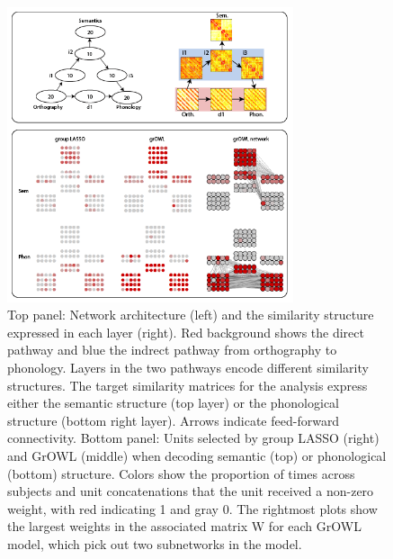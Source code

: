 \begin{figure}[!t]
\centering
\includegraphics[width=0.75\textwidth]{figures/Network_results.png}
\caption{Top panel: Network architecture (left) and the similarity structure expressed in
  each layer (right). Red background shows the direct pathway and blue the indrect pathway
  from orthography to phonology. Layers in the two pathways encode different similarity
  structures. The target similarity matrices for the analysis express either the semantic
  structure (top layer) or the phonological structure (bottom right layer). Arrows indicate
  feed-forward connectivity. Bottom panel: Units selected by group LASSO (right) and GrOWL
  (middle) when decoding semantic (top) or phonological (bottom) structure. Colors show the
  proportion of times across subjects and unit concatenations that the unit received a
  non-zero weight, with red indicating 1 and gray 0. The rightmost plots show the largest
  weights in the associated matrix W for each GrOWL model, which pick out two subnetworks
  in the model.}
\label{fig.network}
\end{figure}


